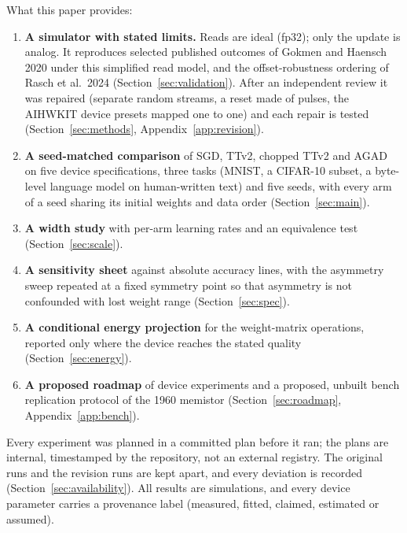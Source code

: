 What this paper provides:
\begin{enumerate}
\item \textbf{A simulator with stated limits.} Reads are ideal (fp32); only the update is analog. It reproduces selected
      published outcomes of Gokmen and Haensch 2020 under this simplified read model, and the offset-robustness ordering of
      Rasch et al.\ 2024 (Section~\ref{sec:validation}). After an independent review it was repaired (separate random streams, a
      reset made of pulses, the AIHWKIT device presets mapped one to one) and each repair is tested (Section~\ref{sec:methods},
      Appendix~\ref{app:revision}).
\item \textbf{A seed-matched comparison} of SGD, TTv2, chopped TTv2 and AGAD on five device specifications, three tasks (MNIST, a
      CIFAR-10 subset, a byte-level language model on human-written text) and five seeds, with every arm of a seed sharing its
      initial weights and data order (Section~\ref{sec:main}).
\item \textbf{A width study} with per-arm learning rates and an equivalence test (Section~\ref{sec:scale}).
\item \textbf{A sensitivity sheet} against absolute accuracy lines, with the asymmetry sweep repeated at a fixed symmetry point
      so that asymmetry is not confounded with lost weight range (Section~\ref{sec:spec}).
\item \textbf{A conditional energy projection} for the weight-matrix operations, reported only where the device reaches the
      stated quality (Section~\ref{sec:energy}).
\item \textbf{A proposed roadmap} of device experiments and a proposed, unbuilt bench replication protocol of the 1960
      memistor (Section~\ref{sec:roadmap}, Appendix~\ref{app:bench}).
\end{enumerate}

Every experiment was planned in a committed plan before it ran; the plans are internal, timestamped by the repository, not an
external registry. The original runs and the revision runs are kept apart, and every deviation is recorded
(Section~\ref{sec:availability}). All results are simulations, and every device parameter carries a provenance label
(measured, fitted, claimed, estimated or assumed).
